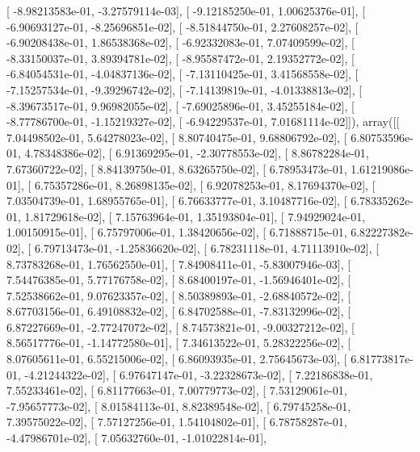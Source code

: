 \documentclass{article}
\begin{document}
       [ -8.98213583e-01,  -3.27579114e-03],
       [ -9.12185250e-01,   1.00625376e-01],
       [ -6.90693127e-01,  -8.25696851e-02],
       [ -8.51844750e-01,   2.27608257e-02],
       [ -6.90208438e-01,   1.86538368e-02],
       [ -6.92332083e-01,   7.07409599e-02],
       [ -8.33150037e-01,   3.89394781e-02],
       [ -8.95587472e-01,   2.19352772e-02],
       [ -6.84054531e-01,  -4.04837136e-02],
       [ -7.13110425e-01,   3.41568558e-02],
       [ -7.15257534e-01,  -9.39296742e-02],
       [ -7.14139819e-01,  -4.01338813e-02],
       [ -8.39673517e-01,   9.96982055e-02],
       [ -7.69025896e-01,   3.45255184e-02],
       [ -8.77786700e-01,  -1.15219327e-02],
       [ -6.94229537e-01,   7.01681114e-02]]), array([[  7.04498502e-01,   5.64278023e-02],
       [  8.80740475e-01,   9.68806792e-02],
       [  6.80753596e-01,   4.78348386e-02],
       [  6.91369295e-01,  -2.30778553e-02],
       [  8.86782284e-01,   7.67360722e-02],
       [  8.84139750e-01,   8.63265750e-02],
       [  6.78953473e-01,   1.61219086e-01],
       [  6.75357286e-01,   8.26898135e-02],
       [  6.92078253e-01,   8.17694370e-02],
       [  7.03504739e-01,   1.68955765e-01],
       [  6.76633777e-01,   3.10487716e-02],
       [  6.78335262e-01,   1.81729618e-02],
       [  7.15763964e-01,   1.35193804e-01],
       [  7.94929024e-01,   1.00150915e-01],
       [  6.75797006e-01,   1.38420656e-02],
       [  6.71888715e-01,   6.82227382e-02],
       [  6.79713473e-01,  -1.25836620e-02],
       [  6.78231118e-01,   4.71113910e-02],
       [  8.73783268e-01,   1.76562550e-01],
       [  7.84908411e-01,  -5.83007946e-03],
       [  7.54476385e-01,   5.77176758e-02],
       [  8.68400197e-01,  -1.56946401e-02],
       [  7.52538662e-01,   9.07623357e-02],
       [  8.50389893e-01,  -2.68840572e-02],
       [  8.67703156e-01,   6.49108832e-02],
       [  6.84702588e-01,  -7.83132996e-02],
       [  6.87227669e-01,  -2.77247072e-02],
       [  8.74573821e-01,  -9.00327212e-02],
       [  8.56517776e-01,  -1.14772580e-01],
       [  7.34613522e-01,   5.28322256e-02],
       [  8.07605611e-01,   6.55215006e-02],
       [  6.86093935e-01,   2.75645673e-03],
       [  6.81773817e-01,  -4.21244322e-02],
       [  6.97647147e-01,  -3.22328673e-02],
       [  7.22186838e-01,   7.55233461e-02],
       [  6.81177663e-01,   7.00779773e-02],
       [  7.53129061e-01,  -7.95657773e-02],
       [  8.01584113e-01,   8.82389548e-02],
       [  6.79745258e-01,   7.39575022e-02],
       [  7.57127256e-01,   1.54104802e-01],
       [  6.78758287e-01,  -4.47986701e-02],
       [  7.05632760e-01,  -1.01022814e-01],
\end{document}
